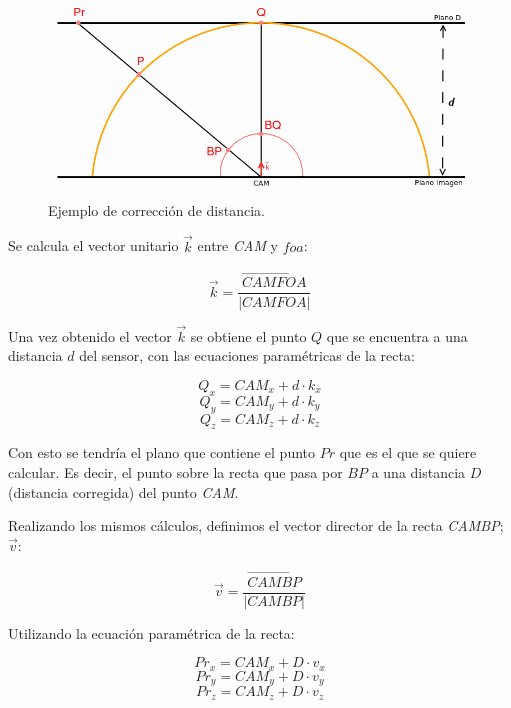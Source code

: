 \begin{figure}[th]
\centering
\includegraphics[scale=0.5]{Figures/calculate-3d.png}
\decoRule
\caption[Ejemplo de corrección de distancia]{Ejemplo de corrección de distancia.}
\label{fig:calculate3d}
\end{figure}

Se calcula el vector unitario $\vec{k}$ entre \textit{CAM} y $foa$:

\begin{equation}
\vec{k}=\frac{\overrightarrow{CAMFOA}}{|CAMFOA|}
\end{equation}

Una vez obtenido el vector $\vec{k}$ se obtiene el punto $Q$ que se encuentra a una distancia $d$ del sensor, con las ecuaciones paramétricas de la recta:

\begin{equation}
Q_{x}=CAM_{x}+d\cdot k_{x}
\end{equation}
\[ Q_{y}=CAM_{y}+d\cdot k_{y} \]
\[ Q_{z}=CAM_{z}+d\cdot k_{z} \]

Con esto se tendría el plano que contiene el punto $Pr$ que es el que se quiere calcular. Es decir, el punto sobre la recta que pasa por $BP$ a una distancia $D$ (distancia corregida) del punto \textit{CAM}.

Realizando los mismos cálculos, definimos el vector director de la recta \textit{CAMBP}; $\vec{v}$:

\begin{equation}
\vec{v}=\frac{\overrightarrow{CAMBP}}{|CAMBP|}
\end{equation}

Utilizando la ecuación paramétrica de la recta:

\begin{equation}
Pr_{x}=CAM_{x}+D\cdot v_{x}
\label{eqn:param}
\end{equation}
\[ Pr_{y}=CAM_{y}+D\cdot v_{y} \]
\[ Pr_{z}=CAM_{z}+D\cdot v_{z} \]


